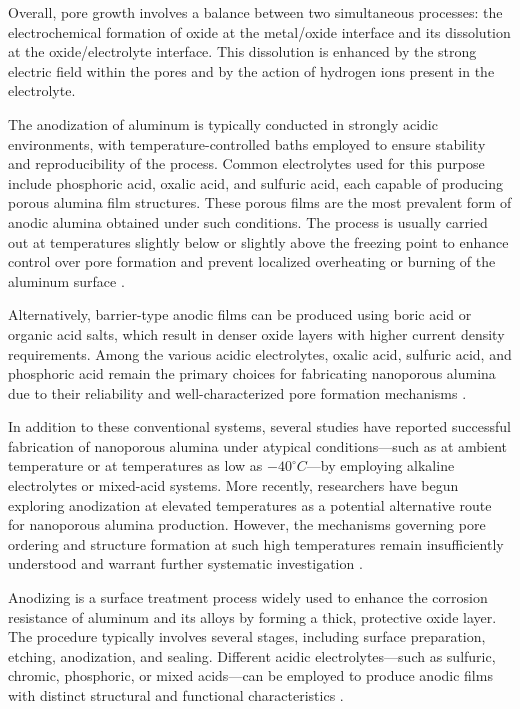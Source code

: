 \documentclass{rapportCS}
\begin{document}
	Overall, pore growth involves a balance between two simultaneous processes: the electrochemical formation of oxide at the metal/oxide interface and its dissolution at the oxide/electrolyte interface. This dissolution is enhanced by the strong electric field within the pores and by the action of hydrogen ions present in the electrolyte\cite{lv2017research}.
	
	The anodization of aluminum is typically conducted in strongly acidic environments, with temperature-controlled baths employed to ensure stability and reproducibility of the process. Common electrolytes used for this purpose include phosphoric acid, oxalic acid, and sulfuric acid, each capable of producing porous alumina film structures. These porous films are the most prevalent form of anodic alumina obtained under such conditions. The process is usually carried out at temperatures slightly below or slightly above the freezing point to enhance control over pore formation and prevent localized overheating or burning of the aluminum surface \cite{bibideessaa2023review}.
	
	Alternatively, barrier-type anodic films can be produced using boric acid or organic acid salts, which result in denser oxide layers with higher current density requirements. Among the various acidic electrolytes, oxalic acid, sulfuric acid, and phosphoric acid remain the primary choices for fabricating nanoporous alumina due to their reliability and well-characterized pore formation mechanisms \cite{eessaa2023review}.
	
	In addition to these conventional systems, several studies have reported successful fabrication of nanoporous alumina under atypical conditions—such as at ambient temperature or at temperatures as low as $-40^\circ C$—by employing alkaline electrolytes or mixed-acid systems. More recently, researchers have begun exploring anodization at elevated temperatures as a potential alternative route for nanoporous alumina production. However, the mechanisms governing pore ordering and structure formation at such high temperatures remain insufficiently understood and warrant further systematic investigation \cite{eessaa2023review}.
	
	Anodizing is a surface treatment process widely used to enhance the corrosion resistance of aluminum and its alloys by forming a thick, protective oxide layer. The procedure typically involves several stages, including surface preparation, etching, anodization, and sealing. Different acidic electrolytes—such as sulfuric, chromic, phosphoric, or mixed acids—can be employed to produce anodic films with distinct structural and functional characteristics \cite{eessaa2023review}.
	
\end{document}
